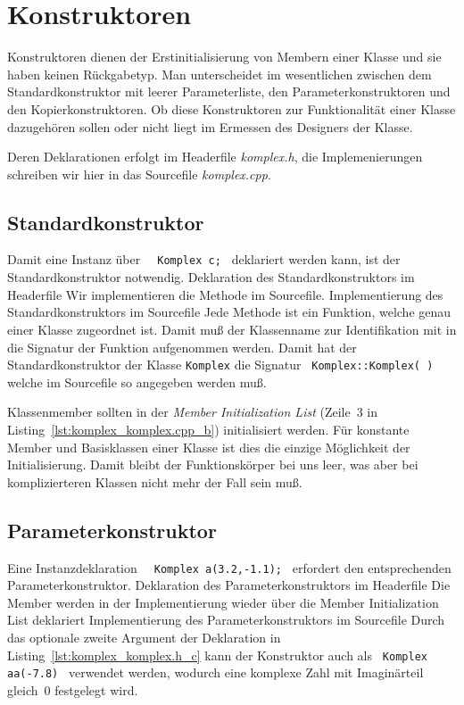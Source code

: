 %
\section{Konstruktoren}
\label{p:9.2}
Konstruktoren dienen der Erstinitialisierung von Membern einer Klasse und sie haben keinen
Rückgabetyp.
Man unterscheidet im wesentlichen zwischen dem Standardkonstruktor mit leerer Parameterliste,
den Parameterkonstruktoren und den Kopierkonstruktoren.
Ob diese Konstruktoren zur Funktionalität einer Klasse dazugehören sollen oder
nicht liegt im Ermessen des Designers der Klasse.

Deren Deklarationen erfolgt im Headerfile \emph{komplex.h}, die Implemenierungen schreiben wir hier
in das Sourcefile \emph{komplex.cpp}.
%
%

\subsection{Standardkonstruktor}
\label{p:9.2.1}
%
Damit eine Instanz über \verb|  Komplex c; | deklariert werden kann, ist
der Standardkonstruktor notwendig.
%
{Deklaration des Standardkonstruktors im Headerfile}
%
Wir implementieren die Methode im Sourcefile.
{Implementierung des Standardkonstruktors im Sourcefile}
%
Jede Methode ist ein Funktion, welche genau einer Klasse zugeordnet ist.
Damit muß der Klassenname zur Identifikation mit in die Signatur der Funktion aufgenommen werden.
Damit hat der Standardkonstruktor der Klasse \texttt{Komplex} die Signatur
\verb| Komplex::Komplex( ) | welche im Sourcefile so angegeben werden muß.

Klassenmember sollten in der \emph{Member Initialization List}
(Zeile~3 in Listing~\ref{lst:komplex_komplex.cpp_b}) initialisiert werden.
Für konstante Member und Basisklassen einer Klasse ist dies die einzige
Möglichkeit der Initialisierung.
Damit bleibt der Funktionskörper bei uns leer, was aber bei komplizierteren
Klassen nicht mehr der Fall sein muß.

\subsection{Parameterkonstruktor}
\label{p:9.2.2}
%
Eine Instanzdeklaration  \verb|  Komplex a(3.2,-1.1); | erfordert
den entsprechenden Parameterkonstruktor.
{Deklaration des Parameterkonstruktors im Headerfile}
%
Die Member werden in der Implementierung wieder über die {Member Initialization List}
deklariert
{Implementierung des Parameterkonstruktors im Sourcefile}
%
Durch das optionale zweite Argument der Deklaration in Listing~\ref{lst:komplex_komplex.h_c}
kann der Konstruktor auch als \verb| Komplex aa(-7.8) |  verwendet werden, wodurch
eine komplexe Zahl mit Imaginärteil gleich~0 festgelegt wird.

